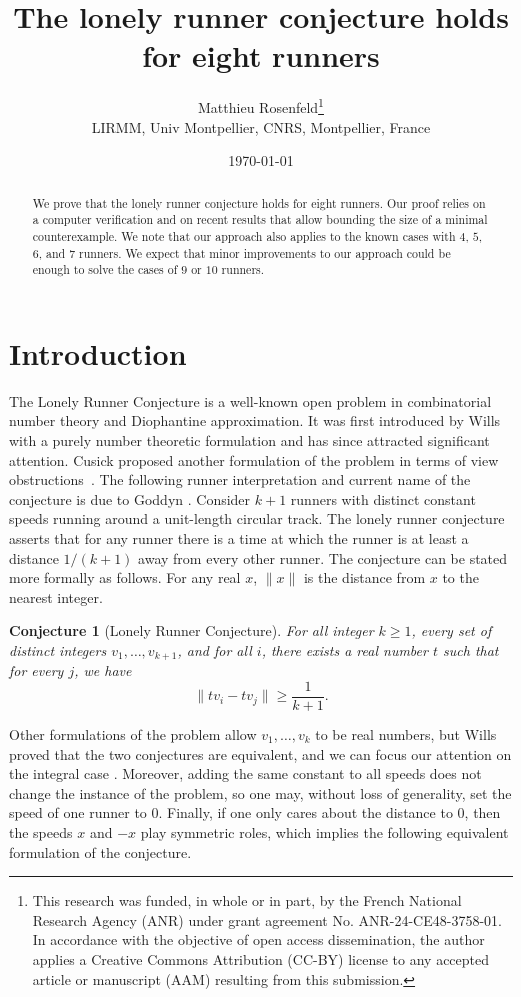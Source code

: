 \documentclass[11pt,a4paper]{article}
\title{The lonely runner conjecture holds for eight runners}
\author{Matthieu Rosenfeld\thanks{
 This research was funded, in whole or in part, by the French National Research Agency (ANR) under grant agreement No. ANR-24-CE48-3758-01. In accordance with the objective of open access dissemination, the author applies a Creative Commons Attribution (CC-BY) license to any accepted article or manuscript (AAM) resulting from this submission.
}\\
LIRMM, Univ Montpellier, CNRS, Montpellier, France
}
\date{\today}
\newtheorem{conjecture}{Conjecture}
\theoremstyle{definition}
\theoremstyle{remark}
\begin{document}
\maketitle
\begin{abstract}
We prove that the lonely runner conjecture holds for eight runners. Our proof relies on a computer verification and on recent results that allow bounding the size of a minimal counterexample. We note that our approach also applies to the known cases with $4$, $5$, $6$, and $7$ runners. We expect that minor improvements to our approach could be enough to solve the cases of $9$ or $10$ runners.
\end{abstract}

\section{Introduction}

The Lonely Runner Conjecture is a well-known open problem in combinatorial number theory and Diophantine approximation. It was first introduced by Wills~\cite{phdWills1965,Wills1967Jun} with a purely number theoretic formulation and has since attracted significant attention. Cusick proposed another formulation of the problem in terms of view obstructions~\cite{Cusick1973}. The following runner interpretation  and current name of the conjecture is due to Goddyn \cite{Bienia1998Jan}. Consider $k+1$ runners with distinct constant speeds running around a unit-length circular track. The lonely runner conjecture asserts that for any runner there is a time at which the runner is at least a distance $1/(k+1)$ away from every other runner. The conjecture can be stated more formally as follows.
For any real $x$, $\|x\|$ is the distance from $x$ to the nearest integer.

\begin{conjecture}[Lonely Runner Conjecture]
For all integer $k \geq 1$, every set of distinct integers $v_1, \ldots, v_{k+1}$, and for all $i$, there exists a real number $t$ such that for every $j$, we have 
\[
  \|tv_i-tv_j\| \geq \frac{1}{k+1}.
\]
\end{conjecture}

Other formulations of the problem allow $v_1, \ldots, v_k$ to be real numbers, but Wills proved that the two conjectures are equivalent, and we can focus our attention on the integral case \cite{Wills1968Jun}. Moreover, adding the same constant to all speeds does not change the instance of the problem, so one may, without loss of generality, set the speed of one runner to $0$. Finally, if one only cares about the distance to $0$, then the speeds $x$ and $-x$ play symmetric roles, which implies the following equivalent formulation of the conjecture.
\end{document}
